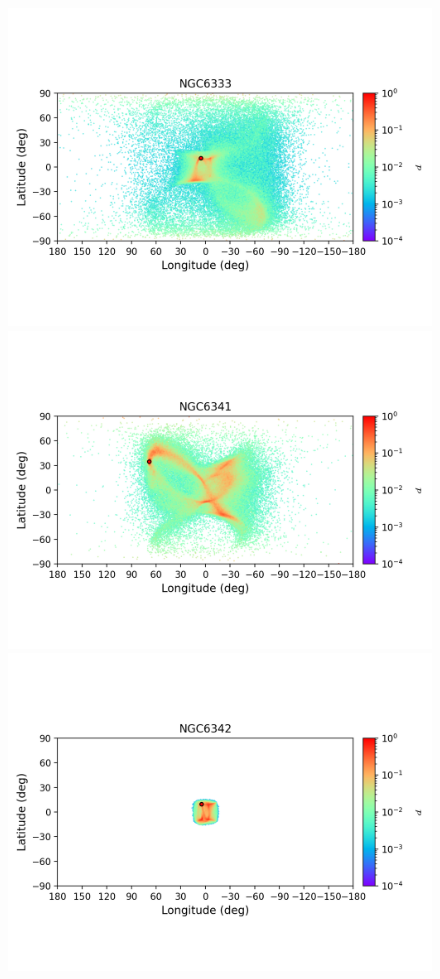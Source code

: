         \begin{figure}
        \includegraphics[clip=true, trim = 0mm 20mm 0mm 10mm, width=1\columnwidth]{images/error_plots_NGC6333.png}
        \includegraphics[clip=true, trim = 0mm 20mm 0mm 10mm, width=1\columnwidth]{images/error_plots_NGC6341.png}
        \includegraphics[clip=true, trim = 0mm 20mm 0mm 10mm, width=1\columnwidth]{images/error_plots_NGC6342.png}

\end{figure}
